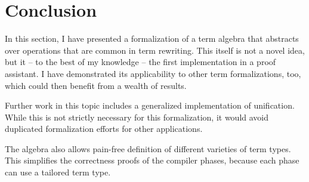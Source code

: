 
\section{Conclusion}

In this section, I have presented a formalization of a term algebra that abstracts over operations that are common in term rewriting.
This itself is not a novel idea, but it -- to the best of my knowledge -- the first implementation in a proof assistant.
I have demonstrated its applicability to other term formalizations, too, which could then benefit from a wealth of results.

Further work in this topic includes a generalized implementation of unification.
While this is not strictly necessary for this formalization, it would avoid duplicated formalization efforts for other applications.

The algebra also allows pain-free definition of different varieties of term types.
This simplifies the correctness proofs of the compiler phases, because each phase can use a tailored term type.